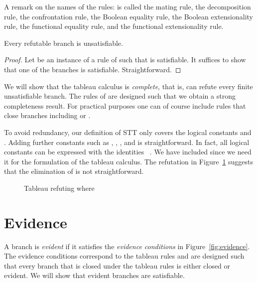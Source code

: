 A remark on the names of the rules: \TRMat is called
the mating rule, \TRDec the decomposition rule, \TRCon
the confrontation rule, \TRBQ the Boolean equality rule, \TRBE
the Boolean extensionality rule, \TRFQ the functional equality
rule, and \TRFE the functional extensionality rule.

\begin{prop}[Soundness] \label{prop:ts-sound}
  Every refutable branch is unsatisfiable.
\end{prop}

\begin{proof}
  Let  be an instance of a rule of 
  such that  is satisfiable.  It suffices to show
  that one of the branches  is satisfiable.
  Straightforward.
\end{proof}

We will show that the tableau calculus  is
\emph{complete}, that is, can refute every finite
unsatisfiable branch.  The rules of  are designed
such that we obtain a strong completeness result.
For practical purposes one can of course include rules 
that close branches including 
or .

To avoid redundancy, our definition of STT only covers the logical
constants  and .
Adding further constants such as , , ,
 and  is straightforward.
In fact, all logical constants can be expressed with the identities
~\cite{AndrewsBook}.  We have included  since we need
it for the formulation of the tableau calculus.  The refutation
in Figure~\ref{fig:refutationneg}
suggests that the elimination of  is not straightforward.


\begin{figure}[t]
  
\caption{Tableau refuting  where }
\label{fig:refutationneg}
\end{figure}

\section{Evidence}

A branch  is \emph{evident} if it satisfies the
\emph{evidence conditions} in
Figure~\ref{fig:evidence}.  The evidence conditions
correspond to the tableau rules and are designed such
that every branch that is closed under the
tableau rules is either closed or evident.  We will show that evident
branches are satisfiable.

